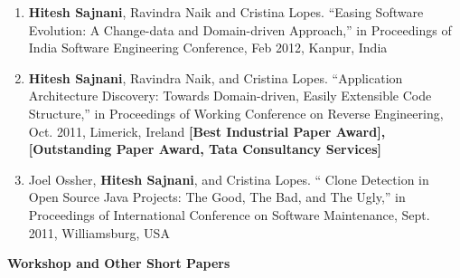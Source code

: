 \documentclass[letterpaper,11pt]{article}
\begin{document}
\begin{enumerate}
{of Structured Artifact Repositories,” Proceedings of Working Conference on Reverse
Engineering, Oct. 2012, Kingston, Canada }
 \vspace{-1pt}\item\small{\textbf{Hitesh Sajnani}, Ravindra Naik and Cristina Lopes. “Easing Software Evolution: A
Change-data and Domain-driven Approach,” in Proceedings of India Software Engineering
Conference, Feb 2012, Kanpur, India }
 \vspace{-1pt}\item\small{\textbf{Hitesh Sajnani}, Ravindra Naik, and Cristina Lopes. “Application Architecture Discovery:
Towards Domain-driven, Easily Extensible Code Structure,” in Proceedings of
Working Conference on Reverse Engineering, Oct. 2011, Limerick, Ireland \textbf{[Best Industrial
Paper Award], [Outstanding Paper Award, Tata Consultancy Services]} }
 \vspace{-1pt}\item\small{Joel Ossher, \textbf{Hitesh Sajnani}, and Cristina Lopes. “ Clone Detection in Open Source
Java Projects: The Good, The Bad, and The Ugly,” in Proceedings of International
Conference on Software Maintenance, Sept. 2011, Williamsburg, USA }

\end{enumerate}
\textbf{Workshop and Other Short Papers}
\end{document}
